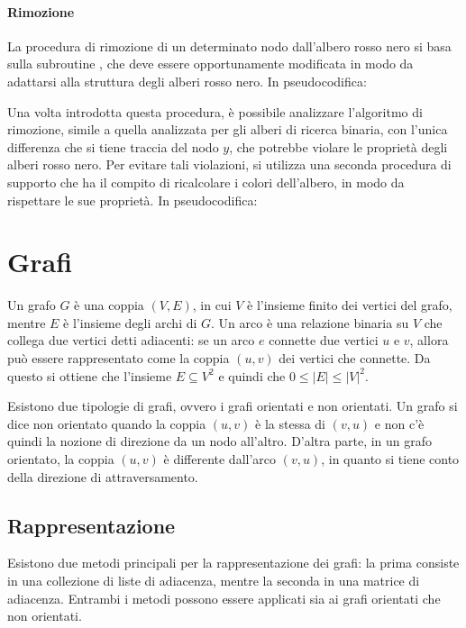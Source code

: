 \paragraph{Rimozione}
La procedura di rimozione di un determinato nodo dall'albero rosso nero si basa sulla subroutine , che deve essere opportunamente modificata in modo da adattarsi alla struttura degli alberi rosso nero. In pseudocodifica:



Una volta introdotta questa procedura, è possibile analizzare l'algoritmo di rimozione, simile a quella analizzata per gli alberi di ricerca binaria, con l'unica differenza che si tiene traccia del nodo \(y\), che potrebbe violare le proprietà degli alberi rosso nero. Per evitare tali violazioni, si utilizza una seconda procedura di supporto che ha il compito di ricalcolare i colori dell'albero, in modo da rispettare le sue proprietà. In pseudocodifica:





\section{Grafi}
Un grafo \(G\) è una coppia \((V, E)\), in cui \(V\) è l'insieme finito dei vertici del grafo, mentre \(E\) è l'insieme degli archi di \(G\). Un arco è una relazione binaria su \(V\) che collega due vertici detti adiacenti: se un arco \(e\) connette due vertici \(u\) e \(v\), allora può essere rappresentato come la coppia \((u, v)\) dei vertici che connette. Da questo si ottiene che l'insieme \(E\subseteq V^2\) e quindi che \(0 \le |E| \le |V|^2\).

Esistono due tipologie di grafi, ovvero i grafi orientati e non orientati. Un grafo si dice non orientato quando la coppia \((u,v)\) è la stessa di \((v,u)\) e non c'è quindi la nozione di direzione da un nodo all'altro. D'altra parte, in un grafo orientato, la coppia \((u,v)\) è differente dall'arco \((v,u)\), in quanto si tiene conto della direzione di attraversamento. 

\subsection{Rappresentazione}

Esistono due metodi principali per la rappresentazione dei grafi: la prima consiste in una collezione di liste di adiacenza, mentre la seconda in una matrice di adiacenza. Entrambi i metodi possono essere applicati sia ai grafi orientati che non orientati. 

